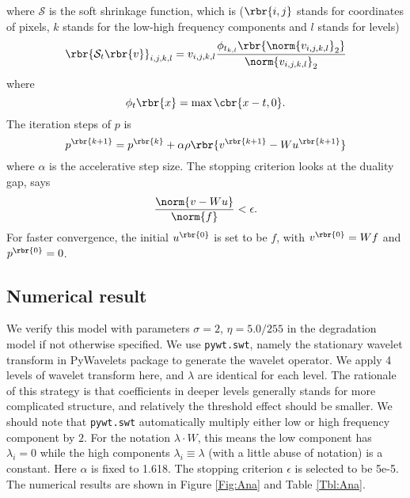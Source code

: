 \documentclass[english, nochinese]{pnote}
\begin{document}
where $\mathcal{S}$ is the soft shrinkage function, which is ($ \rbr{ i, j } $ stands for coordinates of pixels, $k$ stands for the low-high frequency components and $l$ stands for levels)
\begin{equation}
\rbr{ \mathcal{S}_t \rbr{v} }_{ i, j, k, l } = v_{ i, j, k, l } \frac{ \phi_{t_{ k, l }} \rbr{\norm{v_{ i, j, k, l }}_2} }{\norm{v_{ i, j, k, l }}_2}
\end{equation}
where
\begin{equation}
\phi_t \rbr{x} = \max \cbr{ x - t, 0 }.
\end{equation}
The iteration steps of $p$ is
\begin{equation}
p^{\rbr{ k + 1 }} = p^{\rbr{k}} + \alpha \rho \rbr{ v^{\rbr{ k + 1 }} - W u^{\rbr{ k + 1 }} }
\end{equation}
where $\alpha$ is the accelerative step size. The stopping criterion looks at the duality gap, says
\begin{equation}
\frac{\norm{ v - W u }}{\norm{f}} < \epsilon.
\end{equation}
For faster convergence, the initial $u^{\rbr{0}}$ is set to be $f$, with $ v^{\rbr{0}} = W f $ and $ p^{\rbr{0}} = 0 $.

\subsection{Numerical result}

We verify this model with parameters $ \sigma = 2 $, $ \eta = 5.0 / 255 $ in the degradation model if not otherwise specified. We use \verb"pywt.swt", namely the stationary wavelet transform in PyWavelets package to generate the wavelet operator. We apply 4 levels of wavelet transform here, and $\lambda$ are identical for each level. The rationale of this strategy is that coefficients in deeper levels generally stands for more complicated structure, and relatively the threshold effect should be smaller. We should note that \verb"pywt.swt" automatically multiply either low or high frequency component by $2$. For the notation $ \lambda \cdot W $, this means the low component has $ \lambda_i = 0 $ while the high components $ \lambda_i \equiv \lambda $ (with a little abuse of notation) is a constant. Here $\alpha$ is fixed to 1.618. The stopping criterion $\epsilon$ is selected to be 5e-5. The numerical results are shown in Figure \ref{Fig:Ana} and Table \ref{Tbl:Ana}.
\end{document}
